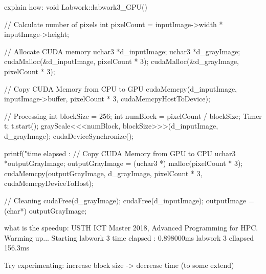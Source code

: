 explain how:
void Labwork::labwork3_GPU() {
    // Calculate number of pixels
    int pixelCount = inputImage->width * inputImage->height;
    
    // Allocate CUDA memory
    uchar3 *d_inputImage;
    uchar3 *d_grayImage;
    cudaMalloc(&d_inputImage, pixelCount * 3);
    cudaMalloc(&d_grayImage, pixelCount * 3);

    // Copy CUDA Memory from CPU to GPU
    cudaMemcpy(d_inputImage, inputImage->buffer, pixelCount * 3, cudaMemcpyHostToDevice);

    // Processing
    int blockSize = 256;
    int numBlock = pixelCount / blockSize;
    Timer t;
    t.start();
    grayScale<<<numBlock, blockSize>>>(d_inputImage, d_grayImage);
    cudaDeviceSynchronize();

    printf("time elapsed : %
    // Copy CUDA Memory from GPU to CPU
    uchar3 *outputGrayImage;
    outputGrayImage = (uchar3 *) malloc(pixelCount * 3);
    cudaMemcpy(outputGrayImage, d_grayImage, pixelCount * 3, cudaMemcpyDeviceToHost);

    // Cleaning
    cudaFree(d_grayImage);
    cudaFree(d_inputImage);
    outputImage = (char*) outputGrayImage;
}

what is the speedup:
USTH ICT Master 2018, Advanced Programming for HPC.
Warming up...
Starting labwork 3
time elapsed : 0.898000ms
labwork 3 ellapsed 156.3ms

Try experimenting:
increase block size -> decrease time (to some extend)

